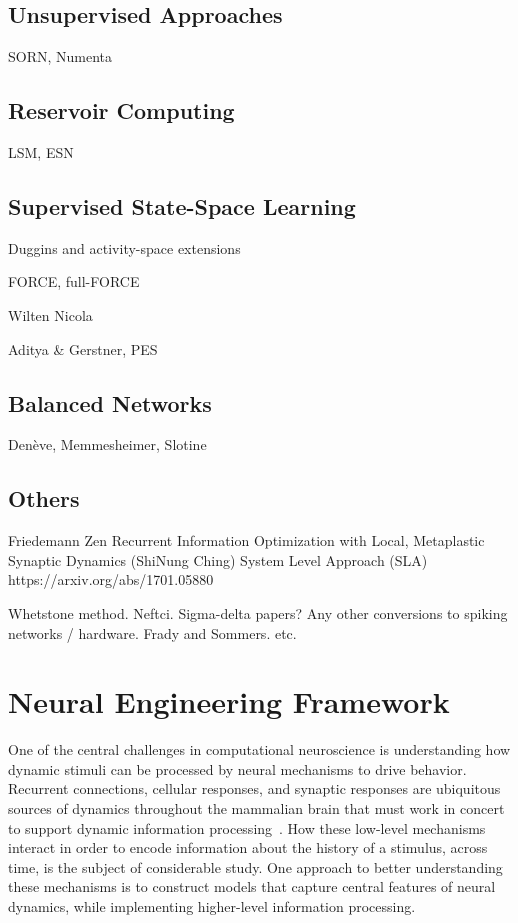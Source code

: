 \subsection{Unsupervised Approaches}

SORN, Numenta

\subsection{Reservoir Computing}

LSM, ESN

\subsection{Supervised State-Space Learning}

Duggins and activity-space extensions

FORCE, full-FORCE

Wilten Nicola

Aditya \& Gerstner, PES

\subsection{Balanced Networks}

Den\`eve, Memmesheimer, Slotine

\subsection{Others}

Friedemann Zen
Recurrent Information Optimization with Local, Metaplastic Synaptic Dynamics (ShiNung Ching)
System Level Approach (SLA) https://arxiv.org/abs/1701.05880

Whetstone method. Neftci. Sigma-delta papers? Any other conversions to spiking networks / hardware. Frady and Sommers. etc.

\section{Neural Engineering Framework}
\label{sec:nef}


\citep{hunsberger2015spiking, hunsberger2016training, hunsberger2018, rasmussen2018nengodl}

One of the central challenges in computational neuroscience is understanding how dynamic stimuli can be processed by neural mechanisms to drive behavior.
Recurrent connections, cellular responses, and synaptic responses are ubiquitous sources of dynamics throughout the mammalian brain that must work in concert to support dynamic information processing~\citep{kandel2000principles}.
How these low-level mechanisms interact in order to encode information about the history of a stimulus, across time, is the subject of considerable study.
One approach to better understanding these mechanisms is to construct models that capture central features of neural dynamics, while implementing higher-level information processing.


